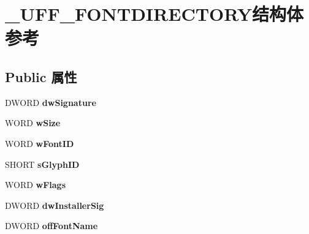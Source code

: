 \hypertarget{struct___u_f_f___f_o_n_t_d_i_r_e_c_t_o_r_y}{}\section{\+\_\+\+U\+F\+F\+\_\+\+F\+O\+N\+T\+D\+I\+R\+E\+C\+T\+O\+R\+Y结构体 参考}
\label{struct___u_f_f___f_o_n_t_d_i_r_e_c_t_o_r_y}
\subsection*{Public 属性}
\begin{DoxyCompactItemize}
\item 
\mbox{\label{struct___u_f_f___f_o_n_t_d_i_r_e_c_t_o_r_y_aa4e4e4903c4c8b1e4ea672264b77f27e}} 
D\+W\+O\+RD {\bfseries dw\+Signature}
\item 
\mbox{\label{struct___u_f_f___f_o_n_t_d_i_r_e_c_t_o_r_y_a6e4bcb93ebc5af792608da65932482dc}} 
W\+O\+RD {\bfseries w\+Size}
\item 
\mbox{\label{struct___u_f_f___f_o_n_t_d_i_r_e_c_t_o_r_y_ace504c08acf110f12ba793b9f1af42ee}} 
W\+O\+RD {\bfseries w\+Font\+ID}
\item 
\mbox{\label{struct___u_f_f___f_o_n_t_d_i_r_e_c_t_o_r_y_a5daccfa987736b76957e7a80c618dd3b}} 
S\+H\+O\+RT {\bfseries s\+Glyph\+ID}
\item 
\mbox{\label{struct___u_f_f___f_o_n_t_d_i_r_e_c_t_o_r_y_a38fd865ef6a5b9c98fcbc0c173bc56b1}} 
W\+O\+RD {\bfseries w\+Flags}
\item 
\mbox{\label{struct___u_f_f___f_o_n_t_d_i_r_e_c_t_o_r_y_a0abf15bcab3f283472cbe35e014dc0ad}} 
D\+W\+O\+RD {\bfseries dw\+Installer\+Sig}
\item 
\mbox{\label{struct___u_f_f___f_o_n_t_d_i_r_e_c_t_o_r_y_aaf6253d067d1d76dc53174c62dfa38e9}} 
D\+W\+O\+RD {\bfseries off\+Font\+Name}
\item 

\end{DoxyCompactItemize}
